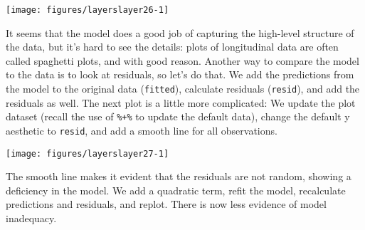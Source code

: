 \begin{Shaded}
\begin{Highlighting}[]
\NormalTok{>}\StringTok{ }\StringTok{ }\NormalTok{(}  \NormalTok{, } \NormalTok{)}
\end{Highlighting}
\end{Shaded}

\begin{flushleft}\texttt{[image: figures/layerslayer26-1]} \end{flushleft}

It seems that the model does a good job of capturing the high-level
structure of the data, but it's hard to see the details: plots of
longitudinal data are often called spaghetti plots, and with good
reason. Another way to compare the model to the data is to look at
residuals, so let's do that. We add the predictions from the model to
the original data (\texttt{fitted}), calculate residuals
(\texttt{resid}), and add the residuals as well. The next plot is a
little more complicated: We update the plot dataset (recall the use of
\texttt{\%+\%} to update the default data), change the default y
aesthetic to \texttt{resid}, and add a smooth line for all observations.

\begin{Shaded}
\end{Shaded}

\begin{flushleft}\texttt{[image: figures/layerslayer27-1]} \end{flushleft}

The smooth line makes it evident that the residuals are not random,
showing a deficiency in the model. We add a quadratic term, refit the
model, recalculate predictions and residuals, and replot. There is now
less evidence of model inadequacy.

